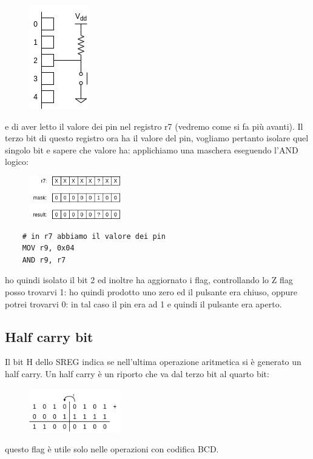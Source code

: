 \begin{figure}[H]
    \centering
    \includegraphics{images/4_Status_register/example_and_1.png}
\end{figure}
e di aver letto il valore dei pin nel registro r7 (vedremo come si fa più avanti). Il terzo bit di questo registro ora ha il valore del pin, vogliamo pertanto isolare quel singolo bit e sapere che valore ha: applichiamo una maschera eseguendo l'AND logico:
\begin{figure}[H]
    \centering
    \includegraphics[width=150px]{images/4_Status_register/example_and_2.png}
\end{figure}

\begin{verbatim}
    # in r7 abbiamo il valore dei pin
    MOV r9, 0x04
    AND r9, r7
\end{verbatim}
ho quindi isolato il bit 2 ed inoltre ha aggiornato i flag, controllando lo Z flag posso trovarvi 1: ho quindi prodotto uno zero ed il pulsante era chiuso, oppure potrei trovarvi 0: in tal caso il pin era ad 1 e quindi il pulsante era aperto.

\subsection{Half carry bit}
Il bit H dello SREG indica se nell'ultima operazione aritmetica si è generato un half carry. Un half carry è un riporto che va dal terzo bit al quarto bit:

\begin{figure}[H]
    \centering
    \includegraphics[width=150px]{images/4_Status_register/half_carry.png}
\end{figure}
questo flag è utile solo nelle operazioni con codifica BCD.

